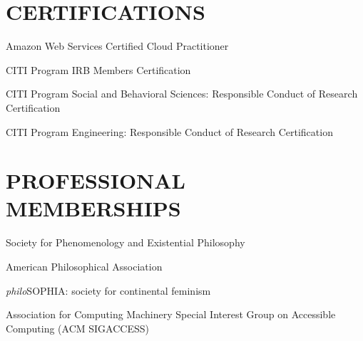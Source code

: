 \documentclass{article}
\newcommand{\listitemspace}{0.25em}
\renewenvironment{itemize}
{\begin{list}{}{\setlength{\leftmargin}{0em}
                \setlength{\parskip}{0em}
                \setlength{\itemsep}{\listitemspace}
                \setlength{\parsep}{\listitemspace}}}
{\end{list}}
\begin{document}
\section*{\normalsize{\MakeUppercase{Certifications}}}
\begin{itemize}
    \item Amazon Web Services Certified Cloud Practitioner
    \item CITI Program IRB Members Certification
    \item CITI Program Social and Behavioral Sciences: Responsible Conduct of Research Certification
    \item CITI Program Engineering: Responsible Conduct of Research Certification
\end{itemize}

\section*{\normalsize{\MakeUppercase{Professional Memberships}}}
\begin{itemize}
    \item Society for Phenomenology and Existential Philosophy
    \item American Philosophical Association
    \item \textit{philo}SOPHIA: society for continental feminism
    \item Association for Computing Machinery \textemdash{} Special Interest Group on Accessible Computing (ACM SIGACCESS)
\end{itemize}
\end{document}
